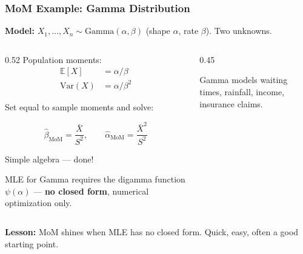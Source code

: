 \documentclass[aspectratio=169]{beamer}
\begin{document}
\begin{frame}
\frametitle{MoM Example: Gamma Distribution}

\small
\textbf{Model:} $X_1, \ldots, X_n \sim \text{Gamma}(\alpha, \beta)$ \;\;(shape $\alpha$, rate $\beta$). \;Two unknowns.

\vspace{0.1cm}
\begin{columns}[T]
\begin{column}{0.52\textwidth}
Population moments:
\vspace{-0.1cm}
\begin{align*}
\mathbb{E}[X] &= \alpha/\beta \\[2pt]
\text{Var}(X) &= \alpha/\beta^2
\end{align*}

\vspace{-0.2cm}
Set equal to sample moments and solve:

\pause
\vspace{0.1cm}
$$\boxed{\hat\beta_{\text{MoM}} = \frac{\bar{X}}{S^2}, \qquad \hat\alpha_{\text{MoM}} = \frac{\bar{X}^2}{S^2}}$$

\vspace{0.1cm}
\small Simple algebra --- done! \textcolor{paramgreen}{\checkmark}

\vspace{0.1cm}
\footnotesize MLE for Gamma requires the digamma function $\psi(\alpha)$ --- \textbf{no closed form}, numerical optimization only.
\end{column}
\begin{column}{0.45\textwidth}
\begin{center}
\end{center}

\vspace{0.1cm}
\scriptsize\centering
Gamma models waiting times, rainfall, income, insurance claims.
\end{column}
\end{columns}

\vspace{0.15cm}
\centering\small \textbf{Lesson:} MoM shines when MLE has no closed form. Quick, easy, often a good starting point.
\end{frame}
\end{document}
